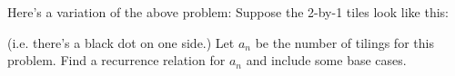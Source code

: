 Here's a variation of the above problem:
Suppose the 2-by-1 tiles look like this:

(i.e. there's a black dot on one side.)
Let $a_n$ be the number of tilings for this problem.
Find a recurrence relation for $a_n$ and include some base cases.
